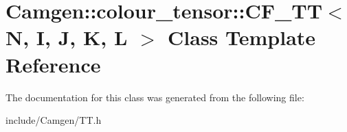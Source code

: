 \hypertarget{a00041}{\section{Camgen\-:\-:colour\-\_\-tensor\-:\-:C\-F\-\_\-\-T\-T$<$ N, I, J, K, L $>$ Class Template Reference}
\label{a00041}
}


The documentation for this class was generated from the following file\-:\begin{DoxyCompactItemize}
\item 
include/\-Camgen/T\-T.\-h\end{DoxyCompactItemize}
